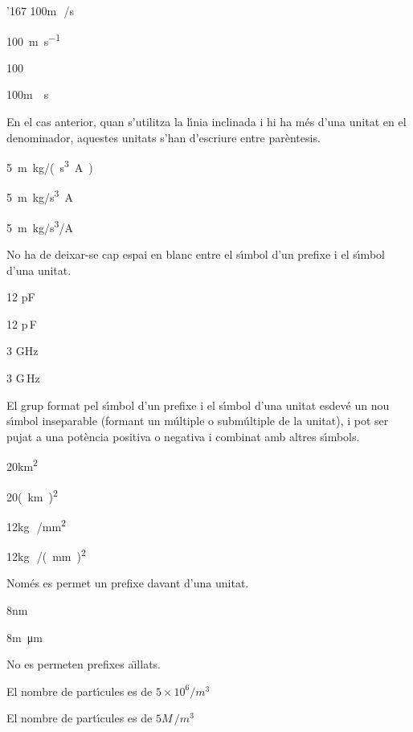 \begin{dinglist}{'167}
\textcolor{Green}{} 100\unit{m\,/s}

\textcolor{Green}{} \SI{100}{m.s^{-1}}

\textcolor{Green}{} 100\unit{}

\textcolor{Red}{} 100\unit{m\div s}

En el cas anterior, quan s'utilitza la l\'{\i}nia inclinada i hi ha m\'{e}s
d'una unitat en el denominador, aquestes unitats s'han d'escriure
entre par\`{e}ntesis.

\textcolor{Green}{} \SI{5}{m.kg/(s^3.A)}

\textcolor{Red}{} \SI{5}{m.kg/s^3.A}

\textcolor{Red}{} \SI{5}{m.kg/s^3/A}


\item No ha de deixar-se cap espai en blanc entre el s\'{\i}mbol d'un prefixe i
el s\'{\i}mbol d'una unitat.

\textcolor{Green}{} 12 pF

\textcolor{Red}{} 12 p\,F

\textcolor{Green}{}  3 GHz

\textcolor{Red}{}  3 G\,Hz


\item El grup format pel s\'{\i}mbol d'un prefixe i el s\'{\i}mbol d'una unitat
esdev\'{e} un nou s\'{\i}mbol inseparable (formant un m\'{u}ltiple o subm\'{u}ltiple
de la unitat), i pot ser pujat a una pot\`{e}ncia positiva o negativa i
combinat amb altres s\'{\i}mbols.

\textcolor{Green}{} 20\unit{km^2}

\textcolor{Red}{} 20\unit{(km)^2}

\textcolor{Green}{}  12\unit{kg\,/mm^2}

\textcolor{Red}{}  12\unit{kg\,/(mm)^2}


\item Nom\'{e}s es permet un prefixe davant d'una unitat.

\textcolor{Green}{} 8\unit{nm}

\textcolor{Red}{} 8\unit{m\micro m}


\item No es permeten prefixes a\"{\i}llats.

\textcolor{Green}{} El nombre de part\'{\i}cules es de $5\times 10^6 /\unit{m^3}$

\textcolor{Red}{} El nombre de part\'{\i}cules es de $5 \unit{M\,/m^3}$



\end{dinglist}
